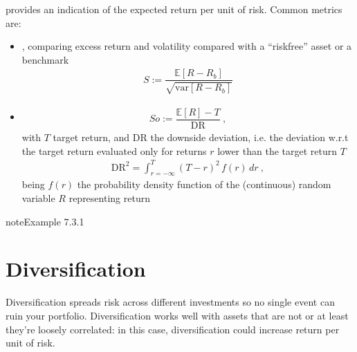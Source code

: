 \documentclass[letterpaper,10pt,english]{jupyterBook}
\begin{document}
\sphinxAtStartPar
{} provides an indication of the expected return per unit of risk. Common metrics are:
\begin{itemize}
\item {} 
\sphinxAtStartPar
{}, comparing excess return and volatility compared with a “risk\sphinxhyphen{}free” asset \sphinxhyphen{} or a benchmark
\begin{equation*}
\begin{split}S := \dfrac{\mathbb{E}[R-R_b]}{\sqrt{\text{var}[R-R_b]}}\end{split}
\end{equation*}
\item {} 
\sphinxAtStartPar
{}
\begin{equation*}
\begin{split}So := \dfrac{\mathbb{E}[R] - T}{\text{DR}} \ ,\end{split}
\end{equation*}
\sphinxAtStartPar
with \(T\) target return, and \(\text{DR}\) the downside deviation, i.e. the deviation w.r.t the target return evaluated only for returns \(r\) lower than the target return \(T\)
\begin{equation*}
\begin{split}\text{DR}^2 = \int_{r=-\infty}^{T} (T-r)^2 \, f(r) \, dr \ ,\end{split}
\end{equation*}
\sphinxAtStartPar
being \(f(r)\) the probability density function of the (continuous) random variable \(R\) representing return

\end{itemize}
\label{ch/principles/intro_nb:example-3}
\begin{sphinxadmonition}{note}{Example 7.3.1}


\end{sphinxadmonition}


\section{Diversification}
\label{\detokenize{ch/principles/intro_nb:diversification}}\label{\detokenize{ch/principles/intro_nb:fin-edu-principles-diversification}}
\sphinxAtStartPar
Diversification spreads risk across different investments so no single event can ruin your portfolio. Diversification works well with assets that are not \sphinxhyphen{} or at least they’re loosely \sphinxhyphen{} correlated: in this case, diversification could increase return per unit of risk.
\end{document}

